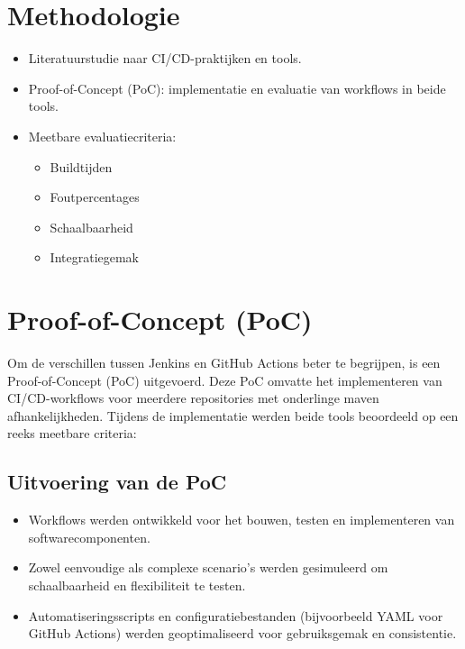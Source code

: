 \documentclass[a0,portrait]{hogent-poster}
\begin{document}
\begin{multicols}{2}
        \section*{Methodologie}
        \begin{itemize}
            \item Literatuurstudie naar CI/CD-praktijken en tools.
            \item Proof-of-Concept (PoC): implementatie en evaluatie van workflows in beide tools.
            \item Meetbare evaluatiecriteria:
            \begin{itemize}
                \item Buildtijden
                \item Foutpercentages
                \item Schaalbaarheid
                \item Integratiegemak
            \end{itemize}
        \end{itemize}
        
        \section*{Proof-of-Concept (PoC)}
        Om de verschillen tussen Jenkins en GitHub Actions beter te begrijpen, is een Proof-of-Concept (PoC) uitgevoerd. Deze PoC omvatte het implementeren van CI/CD-workflows voor meerdere repositories met onderlinge maven afhankelijkheden. Tijdens de implementatie werden beide tools beoordeeld op een reeks meetbare criteria:
        
        \subsection*{Uitvoering van de PoC}
        \begin{itemize}
            \item Workflows werden ontwikkeld voor het bouwen, testen en implementeren van softwarecomponenten.
            \item Zowel eenvoudige als complexe scenario’s werden gesimuleerd om schaalbaarheid en flexibiliteit te testen.
            \item Automatiseringsscripts en configuratiebestanden (bijvoorbeeld YAML voor GitHub Actions) werden geoptimaliseerd voor gebruiksgemak en consistentie.
        \end{itemize}
        

\end{multicols}
\end{document}
